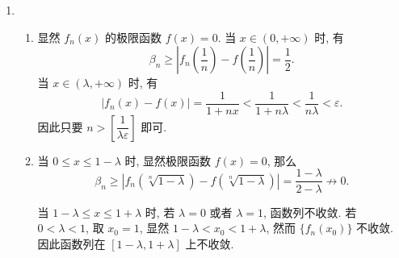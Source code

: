 % 
\begin{enumerate}
    \item %
        \begin{enumerate}[(1)]
            \item %
                显然 $f_n(x)$ 的极限函数 $f(x) = 0$. 当 $x\in(0, +\infty)$ 时, 有
                \[
                    \beta_n \geq \left| f_n\left(\frac1n\right) - f\left(\frac1n\right) \right| = \frac12.   
                \]
                当 $x \in (\lambda, +\infty)$ 时, 有
                \[
                    \left| f_n(x) - f(x) \right| = \frac{1}{1+nx} < \frac{1}{1+n\lambda} < \frac{1}{n\lambda} < \varepsilon.    
                \]
                因此只要 $n > \left[\dfrac{1}{\lambda\varepsilon}\right]$ 即可.
            \item %
                当 $0 \leq x \leq 1 - \lambda$ 时, 显然极限函数 $f(x) = 0$, 那么
                \[
                    \beta_n \geq |f_n(\sqrt[n]{1-\lambda}) - f(\sqrt[n]{1-\lambda})| = \frac{1-\lambda}{2-\lambda} \not\to 0.
                \]
                
                当 $1-\lambda \leq x \leq 1+\lambda$ 时, 若 $\lambda = 0$ 或者 $\lambda = 1$, 函数列不收敛. 若 $0 < \lambda < 1$, 取 $x_0 = 1$,
                显然 $1-\lambda < x_0 < 1 + \lambda$, 然而 $\{f_n(x_0)\}$ 不收敛. 因此函数列在 $[1-\lambda, 1+\lambda]$ 上不收敛.


\end{enumerate}
\end{enumerate}
